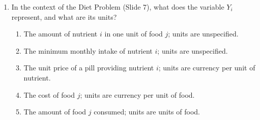\documentclass{article}%
\begin{document}
\begin{enumerate}
\begin{enumerate}
\end{enumerate}%
\vspace{1em}%
\item In the context of the Diet Problem (Slide 7), what does the variable $Y_i$ represent, and what are its units?%
\begin{enumerate}%
\item The amount of nutrient $i$ in one unit of food $j$; units are unspecified.%
\item The minimum monthly intake of nutrient $i$; units are unspecified.%
\item The unit price of a pill providing nutrient $i$; units are currency per unit of nutrient.%
\item The cost of food $j$; units are currency per unit of food.%
\item The amount of food $j$ consumed; units are units of food.%
\end{enumerate}%
\vspace{1em}%
\end{enumerate}

%
\newpage%
\end{document}
